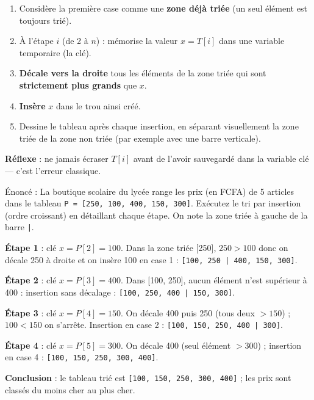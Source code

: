 \documentclass[11pt]{article}
\newcommand{\cle}[1]{{\popxbold\color{popdark}#1}}
\newcounter{popsec}
\newcounter{popsub}
\newcommand{\courssub}[1]{%
  \stepcounter{popsub}%
  \par\vspace{9pt}\noindent{\popxbold\fontsize{11.5}{13}\selectfont\color{popink}{\color{poporange}\thepopsec.\thepopsub}\hspace{6pt}#1}\par\nopagebreak\vspace{4pt}
}
\begin{document}
\courssub{Exécuter le tri par insertion}

\begin{methode}
\begin{enumerate}
  \item Considère la première case comme une \textbf{zone déjà triée} (un seul élément est toujours trié).
  \item À l'étape $i$ (de 2 à $n$) : mémorise la valeur $x = T[i]$ dans une variable temporaire (la \cle{clé}).
  \item \textbf{Décale vers la droite} tous les éléments de la zone triée qui sont \textbf{strictement plus grands} que $x$.
  \item \textbf{Insère} $x$ dans le trou ainsi créé.
  \item Dessine le tableau après chaque insertion, en séparant visuellement la zone triée de la zone non triée (par exemple avec une barre verticale).
\end{enumerate}
\textbf{Réflexe} : ne jamais écraser $T[i]$ avant de l'avoir sauvegardé dans la variable clé — c'est l'erreur classique.
\end{methode}

\begin{exoresolu}
Énoncé : La boutique scolaire du lycée range les prix (en FCFA) de 5 articles dans le tableau \texttt{P = [250, 100, 400, 150, 300]}. Exécutez le tri par insertion (ordre croissant) en détaillant chaque étape.
\tcblower
On note la zone triée à gauche de la barre \texttt{|}.

\textbf{Étape 1} : clé $x = P[2] = 100$. Dans la zone triée [250], $250 > 100$ donc on décale 250 à droite et on insère 100 en case 1 : \texttt{[100, 250 | 400, 150, 300]}.

\textbf{Étape 2} : clé $x = P[3] = 400$. Dans [100, 250], aucun élément n'est supérieur à 400 : insertion sans décalage : \texttt{[100, 250, 400 | 150, 300]}.

\textbf{Étape 3} : clé $x = P[4] = 150$. On décale 400 puis 250 (tous deux $> 150$) ; $100 < 150$ on s'arrête. Insertion en case 2 : \texttt{[100, 150, 250, 400 | 300]}.

\textbf{Étape 4} : clé $x = P[5] = 300$. On décale 400 (seul élément $> 300$) ; insertion en case 4 : \texttt{[100, 150, 250, 300, 400]}.

\textbf{Conclusion} : le tableau trié est \texttt{[100, 150, 250, 300, 400]} ; les prix sont classés du moins cher au plus cher.
\end{exoresolu}
\end{document}

